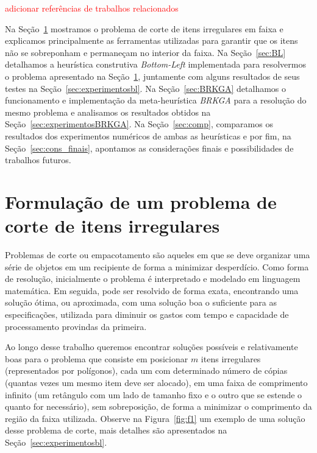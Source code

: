 \documentclass[12pt, openright, twoside, a4paper, english, brazilian]{USPSC-classe/USPSC}
\begin{document}
\textcolor{red}{adicionar referências de trabalhos relacionados}

Na Seção~\ref{sec:irregular} mostramos o problema de corte de itens irregulares em faixa e explicamos principalmente as ferramentas utilizadas para garantir que os itens não se sobreponham e permaneçam no interior da faixa. Na Seção~\ref{sec:BL} detalhamos a heurística construtiva {\it Bottom-Left} implementada para resolvermos o problema apresentado na Seção~\ref{sec:irregular}, juntamente com alguns resultados de seus testes na Seção~\ref{sec:experimentosbl}. Na Seção~\ref{sec:BRKGA} detalhamos o funcionamento e implementação da meta-heurística {\it BRKGA} para a resolução do mesmo problema e analisamos os resultados obtidos na Seção~\ref{sec:experimentosBRKGA}. Na Seção~\ref{sec:comp}, comparamos os resultados dos experimentos numéricos de ambas as heurísticas e por fim, na Seção~\ref{sec:cons_finais}, apontamos as considerações finais e possibilidades de trabalhos futuros.

\section{Formulação de um problema de corte de itens irregulares} \label{sec:irregular}

Problemas de corte ou empacotamento são aqueles em que se deve organizar uma série de objetos em um recipiente de forma a minimizar desperdício. Como forma de resolução, inicialmente o problema é interpretado e modelado em linguagem matemática. Em seguida, pode ser resolvido de forma exata, encontrando uma solução ótima, ou aproximada, com uma solução boa o suficiente para as especificações, utilizada para diminuir os gastos com tempo e capacidade de processamento provindas da primeira.

Ao longo desse trabalho queremos encontrar soluções possíveis e relativamente boas para o problema que consiste em posicionar $m$ itens irregulares (representados por polígonos), cada um com determinado número de cópias (quantas vezes um mesmo item deve ser alocado), em uma faixa de comprimento infinito (um retângulo com um lado de tamanho fixo e o outro que se estende o quanto for necessário), sem sobreposição, de forma a minimizar o comprimento da região da faixa utilizada. Observe na Figura~\ref{fig:f1} um exemplo de uma solução desse problema de corte, mais detalhes são apresentados na Seção~\ref{sec:experimentosbl}.
\end{document}
